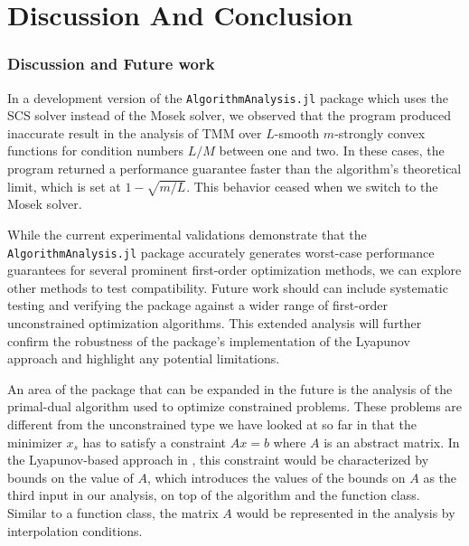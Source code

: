 \chapter{Discussion And Conclusion} \label{chapter:conclusion}

\subsection*{Discussion and Future work}

In a development version of the \texttt{AlgorithmAnalysis.jl} package which uses the SCS \cite{SCS} solver instead of the Mosek solver, we observed that the program produced inaccurate result in the analysis of TMM over $L$-smooth $m$-strongly convex functions for condition numbers $L/M$ between one and two. In these cases, the program returned a performance guarantee faster than the algorithm's theoretical limit, which is set at $1-\sqrt{m/L}$. This behavior ceased when we switch to the Mosek solver.

While the current experimental validations demonstrate that the \texttt{AlgorithmAnalysis.jl} package accurately generates worst-case performance guarantees for several prominent first-order optimization methods, we can explore other methods to test compatibility. Future work should can include systematic testing and verifying the package against a wider range of first-order unconstrained optimization algorithms. This extended analysis will further confirm the robustness of the package's implementation of the Lyapunov approach and highlight any potential limitations.

An area of the package that can be expanded in the future is the analysis of the primal-dual algorithm used to optimize constrained problems. These problems are different from the unconstrained type we have looked at so far in that the minimizer $x_s$ has to satisfy a constraint $Ax = b$ where $A$ is an abstract matrix. In the Lyapunov-based approach in \cite{primaldual}, this constraint would be characterized by bounds on the value of $A$, which introduces the values of the bounds on $A$ as the third input in our analysis, on top of the algorithm and the function class. Similar to a function class, the matrix $A$ would be represented in the analysis by interpolation conditions.

